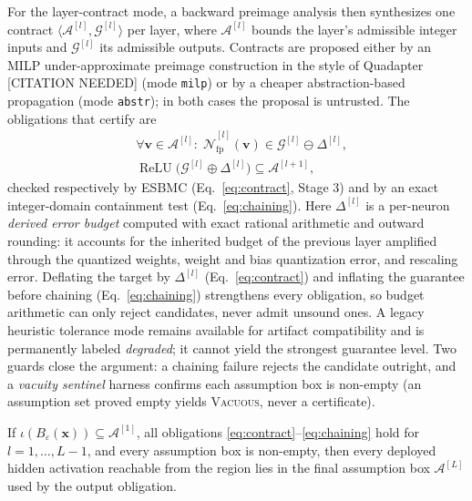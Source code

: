 For the layer-contract mode, a backward preimage analysis then
synthesizes one contract
$\langle \mathcal{A}^{[l]}, \mathcal{G}^{[l]}\rangle$ per layer, where
$\mathcal{A}^{[l]}$ bounds the layer's admissible integer inputs and
$\mathcal{G}^{[l]}$ its admissible outputs. Contracts are proposed
either by an MILP under-approximate preimage construction in the style
of Quadapter [CITATION NEEDED] (mode \texttt{milp}) or by a cheaper
abstraction-based propagation (mode \texttt{abstr}); in both cases the
proposal is untrusted. The obligations that certify are
\begin{align}
  &\forall \mathbf{v}\in\mathcal{A}^{[l]}:\;
    \widehat{\mathcal{N}}^{[l]}_{\mathrm{fp}}(\mathbf{v})
    \in \mathcal{G}^{[l]} \ominus \Delta^{[l]},
  \label{eq:contract}\\
  &\operatorname{ReLU}\bigl(\mathcal{G}^{[l]}
    \oplus \Delta^{[l]}\bigr) \subseteq \mathcal{A}^{[l+1]},
  \label{eq:chaining}
\end{align}
checked respectively by ESBMC (Eq.~\eqref{eq:contract}, Stage 3) and by
an exact integer-domain containment test (Eq.~\eqref{eq:chaining}).
Here $\Delta^{[l]}$ is a per-neuron \emph{derived error budget}
computed with exact rational arithmetic and outward rounding: it
accounts for the inherited budget of the previous layer amplified
through the quantized weights, weight and bias quantization error, and
rescaling error. Deflating the target by $\Delta^{[l]}$
(Eq.~\eqref{eq:contract}) and inflating the guarantee before chaining
(Eq.~\eqref{eq:chaining}) strengthens every obligation, so budget
arithmetic can only reject candidates, never admit unsound ones. A
legacy heuristic tolerance mode remains available for artifact
compatibility and is permanently labeled \emph{degraded}; it cannot
yield the strongest guarantee level. Two guards close the argument:
a chaining failure rejects the candidate outright, and a
\emph{vacuity sentinel} harness confirms each assumption box is
non-empty (an assumption set proved empty yields \textsc{Vacuous},
never a certificate).
 
\begin{lemma}
\label{lem:chaining}
If $\iota(B_\varepsilon(\mathbf{x}))\subseteq\mathcal{A}^{[1]}$, all
obligations \eqref{eq:contract}--\eqref{eq:chaining} hold for
$l=1,\dots,L{-}1$, and every assumption box is non-empty, then every
deployed hidden activation reachable from the region lies in the final
assumption box $\mathcal{A}^{[L]}$ used by the output obligation.
\end{lemma}
 
